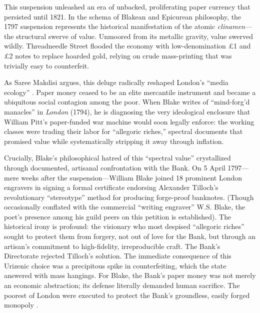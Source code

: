 \documentclass[
]{article}
\begin{document}
This suspension unleashed an era of unbacked, proliferating paper
currency that persisted until 1821. In the schema of Blakean and
Epicurean philosophy, the 1797 suspension represents the historical
manifestation of the atomic \emph{clinamen}---the structural swerve of
value. Unmoored from its metallic gravity, value swerved wildly.
Threadneedle Street flooded the economy with low-denomination £1 and £2
notes to replace hoarded gold, relying on crude mass-printing that was
trivially easy to counterfeit.

As Saree Makdisi argues, this deluge radically reshaped London's ``media
ecology'' \citep{makdisi2003william}. Paper money ceased to be an elite
mercantile instrument and became a ubiquitous social contagion among the
poor. When Blake writes of ``mind-forg'd manacles'' in \emph{London}
(1794), he is diagnosing the very ideological enclosure that William
Pitt's paper-funded war machine would soon legally enforce: the working
classes were trading their labor for ``allegoric riches,'' spectral
documents that promised value while systematically stripping it away
through inflation.

Crucially, Blake's philosophical hatred of this ``spectral value''
crystallized through documented, artisanal confrontation with the Bank.
On 5 April 1797---mere weeks after the suspension---William Blake joined
18 prominent London engravers in signing a formal certificate endorsing
Alexander Tilloch's revolutionary ``stereotype'' method for producing
forge-proof banknotes. (Though occasionally conflated with the
commercial ``writing engraver'' W.S. Blake, the poet's presence among
his guild peers on this petition is established). The historical irony
is profound: the visionary who most despised ``allegoric riches'' sought
to protect them from forgery, not out of love for the Bank, but through
an artisan's commitment to high-fidelity, irreproducible craft. The
Bank's Directorate rejected Tilloch's solution. The immediate
consequence of this Urizenic choice was a precipitous spike in
counterfeiting, which the state answered with mass hangings. For Blake,
the Bank's paper money was not merely an economic abstraction; its
defense literally demanded human sacrifice. The poorest of London were
executed to protect the Bank's groundless, easily forged monopoly
\citep{baucom2005specters, erdman1954prophet}.
\end{document}
